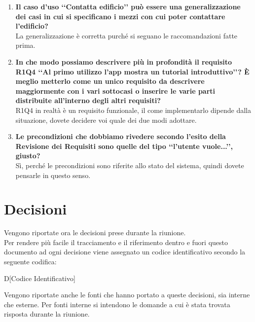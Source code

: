 \documentclass[a4paper,titlepage]{article}
\begin{document}
\begin{enumerate}
	\item \textbf{Il caso d'uso ‘‘Contatta edificio’’ può essere una generalizzazione dei casi in cui si specificano i mezzi con cui poter contattare l'edificio?} \\
	La generalizzazione è corretta purché si seguano le raccomandazioni fatte prima.
	\item \textbf{In che modo possiamo descrivere più in profondità il requisito R1Q4 ‘‘Al primo utilizzo l'app mostra un tutorial introduttivo’’? È meglio metterlo come un unico requisito da descrivere maggiormente con i vari sottocasi o inserire le varie parti distribuite all'interno degli altri requisiti?} \\
	R1Q4 in realtà è un requisito funzionale, il come implementarlo dipende dalla situazione, dovete decidere voi quale dei due modi adottare.
	\item \textbf{Le precondizioni che dobbiamo rivedere secondo l'esito della Revisione dei Requisiti sono quelle del tipo ‘‘l'utente vuole...’’, giusto?}	\\
	Sì, perché le precondizioni sono riferite allo stato del sistema, quindi dovete pensarle in questo senso.
\end{enumerate}

\section{Decisioni}
Vengono riportate ora le decisioni prese durante la riunione. \\
Per rendere più facile il tracciamento e il riferimento dentro e fuori questo documento ad ogni decisione viene assegnato un codice identificativo secondo la seguente codifica:
\begin{center}
D[Codice Identificativo]
\end{center}
Vengono riportate anche le fonti che hanno portato a queste decisioni, sia interne che esterne. Per fonti interne si intendono le domande a cui è stata trovata risposta durante la riunione.
\end{document}

